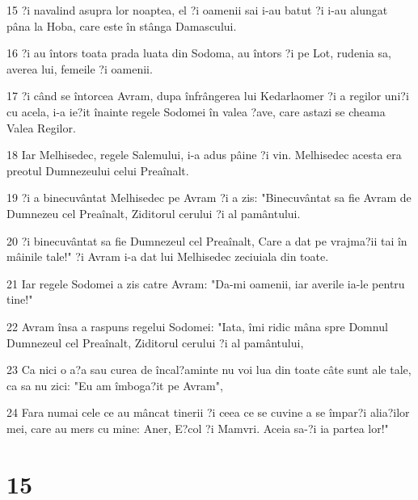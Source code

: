 \par 15 ?i navalind asupra lor noaptea, el ?i oamenii sai i-au batut ?i i-au alungat pâna la Hoba, care este în stânga Damascului.
\par 16 ?i au întors toata prada luata din Sodoma, au întors ?i pe Lot, rudenia sa, averea lui, femeile ?i oamenii.
\par 17 ?i când se întorcea Avram, dupa înfrângerea lui Kedarlaomer ?i a regilor uni?i cu acela, i-a ie?it înainte regele Sodomei în valea ?ave, care astazi se cheama Valea Regilor.
\par 18 Iar Melhisedec, regele Salemului, i-a adus pâine ?i vin. Melhisedec acesta era preotul Dumnezeului celui Preaînalt.
\par 19 ?i a binecuvântat Melhisedec pe Avram ?i a zis: "Binecuvântat sa fie Avram de Dumnezeu cel Preaînalt, Ziditorul cerului ?i al pamântului.
\par 20 ?i binecuvântat sa fie Dumnezeul cel Preaînalt, Care a dat pe vrajma?ii tai în mâinile tale!" ?i Avram i-a dat lui Melhisedec zeciuiala din toate.
\par 21 Iar regele Sodomei a zis catre Avram: "Da-mi oamenii, iar averile ia-le pentru tine!"
\par 22 Avram însa a raspuns regelui Sodomei: "Iata, îmi ridic mâna spre Domnul Dumnezeul cel Preaînalt, Ziditorul cerului ?i al pamântului,
\par 23 Ca nici o a?a sau curea de încal?aminte nu voi lua din toate câte sunt ale tale, ca sa nu zici: "Eu am îmboga?it pe Avram",
\par 24 Fara numai cele ce au mâncat tinerii ?i ceea ce se cuvine a se împar?i alia?ilor mei, care au mers cu mine: Aner, E?col ?i Mamvri. Aceia sa-?i ia partea lor!"

\chapter{15}

